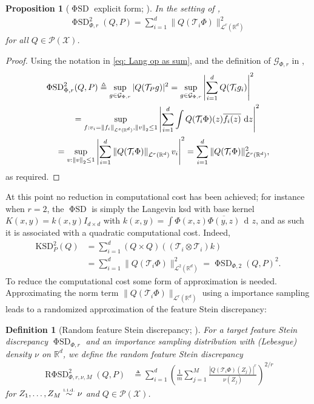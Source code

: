 \documentclass[12pt,paper=letter]{scrreprt}
\newtheorem{proposition}{Proposition}[chapter]
\newtheorem{definition}{Definition}[chapter]
\newcommand{\dee}{\mathop{\mathrm{d}\!}}
\newcommand{\dz}{\,\dee z}
\def\defeq{\triangleq} %
\def\defined{\defeq} %
\def\norm#1{\left\|{#1}\right\|} %
\newcommand{\twonorm}[1]{\norm{#1}_2} %
\def\staticnorm#1{\|{#1}\|} %
\newcommand{\iid}{\textrm{i.i.d.}\xspace}
\newcommand{\dist}{\sim}
\newcommand{\distiid}{\overset{\textrm{\tiny\iid}}{\dist}}
\newcommand{\gset}[0]{\mathcal{G}} %
\newcommand{\opsub}[1]{\mathcal{T}_{#1}} %
\newcommand{\feat}{\Phi} %
\newcommand{\basekernel}{k}  %
\newcommand{\FSD}{\ensuremath{\operatorname{\mathrm{\Phi}SD}}\xspace}
\newcommand{\RFSD}{\ensuremath{\operatorname{R\mathrm{\Phi}SD}}\xspace}
\newcommand{\isdist}{\nu}
\newcommand{\targetdist}{P}
\begin{document}
\begin{proposition}[\FSD explicit form; \citealp{huggins2018random}]
In the setting of ,
\begin{align}
\FSD_{\feat,r}^2(Q,\targetdist) = \sum_{i=1}^d \staticnorm{Q(\opsub{i}{\feat})}_{\mathcal{L}^r(\mathbb{R}^d)}^2
\label{eqn:fsd}
\end{align}
for all $Q \in \mathcal{P}(\mathcal{X})$.
\end{proposition}
\begin{proof}
Using the notation in \eqref{eq: Lang op as sum}, and the definition of $\gset_{\feat,r}$ in ,
\begin{align*}
\FSD_{\feat,r}^2(Q,\targetdist) 
	&\defined \sup_{g\in\gset_{\feat,r}} |Q(\mathcal{T}_P g)|^2
	= \sup_{g\in\gset_{\feat,r}} \left|\sum_{i=1}^d Q(\opsub{i}{g_i})\right|^2  \\ 
	& \hspace{-30pt} = \sup_{f : v_i = \norm{f_i}_{\mathcal{L}^s(\mathbb{R}^d)}, \twonorm{v} \leq 1} \left|\sum_{i=1}^d \int Q(\opsub{i}{\Phi})(z) \overline{f_i(z)} \dz\right|^2 \\
	& \hspace{-50pt}  = \sup_{v : \twonorm{v} \leq 1} \left|\sum_{i=1}^d \norm{Q(\opsub{i}{\Phi})}_{\mathcal{L}^r(\mathbb{R}^d)} v_i\right|^2
	= \sum_{i=1}^d \staticnorm{Q(\opsub{i}{\feat})}_{\mathcal{L}^r(\mathbb{R}^d)}^2 , 
\end{align*}
as required.
\end{proof}

At this point no reduction in computational cost has been achieved; for instance when $r = 2$, the \FSD is simply the Langevin \ac{ksd} with base kernel
$K(x,y) = k(x,y) I_{d \times d}$ with $k(x,y) = \int \Phi(x,z)\overline{\Phi(y,z)} \dz $, and as such it is associated with a quadratic computational cost.
Indeed,
\begin{align*}
\mathrm{KSD}_P^2(Q) 
	& = \sum_{i=1}^d (Q \times Q)((\opsub{i} \otimes \opsub{i})\basekernel) \\
	& = \sum_{i=1}^d \staticnorm{Q(\opsub{i}{\feat})}_{\mathcal{L}^2(\mathbb{R}^d)}^2
	= \FSD_{\Phi,2}(Q,P)^2.
\end{align*}
To reduce the computational cost some form of approximation is needed.
Approximating the norm term $\staticnorm{Q(\opsub{i}{\feat})}_{\mathcal{L}^r(\mathbb{R}^d)}$ using a importance sampling leads to a randomized approximation of the feature Stein discrepancy:

\begin{definition}[Random feature Stein discrepancy; \citealp{huggins2018random}]\label{def:rfsd}
For a target feature Stein discrepancy $\FSD_{\feat,r}$ and an importance sampling distribution with (Lebesgue) density $\nu$ on $\mathbb{R}^d$, we define the \emph{random feature Stein discrepancy} 
\begin{align*}
\RFSD_{\feat,r,\isdist,M}^2(Q,\targetdist)
	&\defined \sum_{i=1}^d \left(\frac{1}{m}\sum_{j=1}^M \frac{|Q(\opsub{i}{\feat})(Z_j)|^r}{\isdist(Z_j)} \right)^{2/r} 
\end{align*}
for $Z_1, \dots, Z_M \distiid \isdist$ and $Q \in \mathcal{P}(\mathcal{X})$.
\end{definition}
\end{document}
